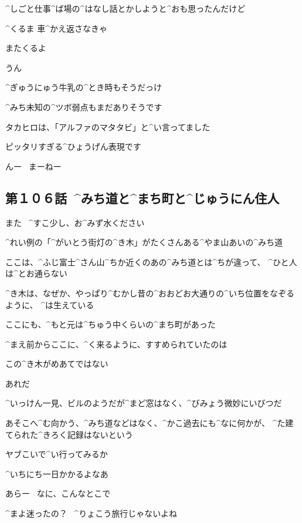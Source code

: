 \Takahiro ^{しごと}{仕事}^{ば}{場}の^{はなし}{話}とかしようと^{おも}{思}ったんだけど

\Takahiro ^{くるま }{車}^{かえ}{返}さなきゃ

\Takahiro またくるよ

\Alpha うん

\Alpha ^{ぎゅうにゅう}{牛乳}の^{とき}{時}もそうだっけ

\Alpha ^{みち}{未知}の^{ツボ}{弱点}もまだありそうです

\page
\Alpha タカヒロは、「アルファのマタタビ」と^{い}{言}ってました

\Alpha ピッタリすぎる^{ひょうげん}{表現}です

\Alpha んー
\ まーねー


\subsection{第１０６話\ ^{みち}{道}と^{まち}{町}と^{じゅうにん}{住人}}

\page[87]
\Alpha また
\ ^{すこ}{少}し、お^{みず}{水}ください

\page
\Ayase ^{れい}{例}の「^{がいとう}{街灯}の^{き}{木}」がたくさんある^{やま}{山}あいの^{みち}{道}

\Ayase ここは、^{ふじ}{富士}^{さん}{山}^{ちか}{近}くのあの^{みち}{道}とは^{ちが}{違}って、
^{ひと}{人}は^{とお}{通}らない

\page
\Ayase ^{き}{木}は、なぜか、やっぱり^{むかし}{昔}の^{おおどお}{大通}りの^{いち}{位置}をなぞるように、
^{は}{生}えている

\Ayase ここにも、^{もと}{元}は^{ちゅう}{中}くらいの^{まち}{町}があった

\Ayase ^{まえ}{前}からここに、^{く}{来}るように、すすめられていたのは

\Ayase この^{き}{木}がめあてではない

\Ayase あれだ

\page
\Ayase ^{いっけん}{一見}、ビルのようだが^{まど}{窓}はなく、^{びみょう}{微妙}にいびつだ

\Ayase あそこへ^{む}{向}かう、^{みち}{道}などはなく、^{かこ}{過去}にも^{なに}{何}かが、
^{た}{建}てられた^{きろく}{記録}はないという

\Ayase ヤブこいで^{い}{行}ってみるか

\Ayase ^{いちにち}{一日}かかるよなあ

\page
\Person あらー
\ なに、こんなとこで

\Person ^{まよ}{迷}ったの？
\ ^{りょこう}{旅行}じゃないよね


